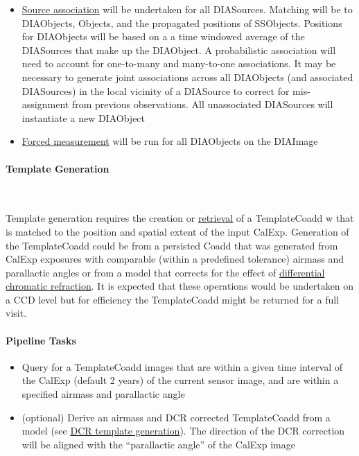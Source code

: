 \begin{itemize}
\item \hyperref[sec:acDIAObjectGeneration]{Source association} will be undertaken for all DIASources. Matching will be to DIAObjects, Objects, and the propagated positions of SSObjects. Positions for DIAObjects will be based on a a time windowed average of the DIASources that make up the DIAObject. A probabilistic association will need to account for one-to-many and many-to-one associations. It may be necessary to generate joint associations across all DIAObjects (and associated DIASources) in the local  vicinity of a DIASource to correct for mis-assignment from previous observations. All unassociated DIASources will instantiate a new DIAObject
\item \hyperref[sec:acForcedMeasurement]{Forced measurement} will be run for all DIAObjects on the DIAImage

\end{itemize}



\label{sec:acDCRTemplates}

\paragraph{Template Generation}~

Template generation requires the creation or \hyperref[sec:acRetrieveTemplate]{retrieval} of a TemplateCoadd w that is matched to the position and spatial extent of the input CalExp. Generation of the TemplateCoadd could be from a persisted Coadd that was generated from CalExp exposures with comparable (within a predefined tolerance) airmass and parallactic angles or from a model that corrects for the effect of  \hyperref[sec:acDCRTemplates]{differential chromatic refraction}. It is expected that these operations would be undertaken on a CCD level but for efficiency the TemplateCoadd might be returned for a full visit. 


\paragraph{Pipeline Tasks}
\begin{itemize}
\item Query for a TemplateCoadd images that are within a given time interval of the CalExp  (default 2 years) of the current sensor image, and are within a specified airmass and parallactic angle
\item (optional) Derive an airmass and DCR corrected TemplateCoadd from a model (see  \hyperref[sec:acDCRTemplates]{ DCR template generation}). The direction of the DCR correction will be aligned with the 
  ``parallactic angle'' of the CalExp image
\end{itemize}

